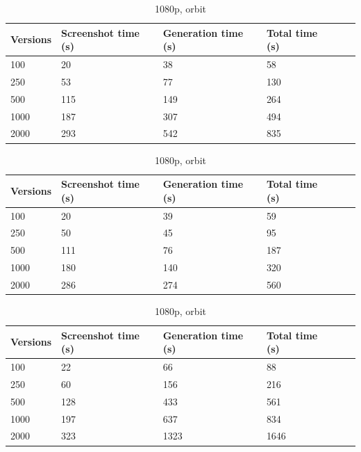 \documentclass[]{usiinfbachelorproject}
\begin{document}
\begin{table}[H]
    \begin{center}
        \begin{tabular}{ | l | l | l | l | l | l |}
        \hline
        Versions & Screenshot time (s) & Generation time (s)& Total time (s) \\ \hline
        100 & 20 & 38 & 58 \\ \hline
        250 & 53 & 77 & 130\\ \hline
        500 & 115 & 149 & 264\\ \hline
        1000 & 187 & 307 & 494 \\ \hline
        2000 & 293 & 542 & 835 \\ \hline
        \end{tabular}
    \end{center}
    \caption{720p, orbit}
    \label{tab:performance}

    \begin{center}
        \begin{tabular}{ | l | l | l | l | l | l |}
        \hline
        Versions & Screenshot time (s) & Generation time (s)& Total time (s) \\ \hline
        100 & 20 & 39 & 59 \\ \hline
        250 & 50 & 45 & 95\\ \hline
        500 & 111 & 76 & 187\\ \hline
        1000 & 180 & 140 & 320 \\ \hline
        2000 & 286 & 274 & 560 \\ \hline
        \end{tabular}
    \end{center}
    \caption{720p, no orbit}
    \label{tab:performance}

    \begin{center}
        \begin{tabular}{ | l | l | l | l | l | l |}
        \hline
        Versions & Screenshot time (s) & Generation time (s)& Total time (s) \\ \hline
        100 & 22 & 66 & 88 \\ \hline
        250 & 60 & 156 & 216\\ \hline
        500 & 128 & 433 & 561\\ \hline
        1000 & 197 & 637 & 834\\ \hline
        2000 & 323 & 1323 & 1646\\ \hline
        \end{tabular}
    \end{center}
    \caption{1080p, orbit}
    \label{tab:performance}


\end{table}
\end{document}
